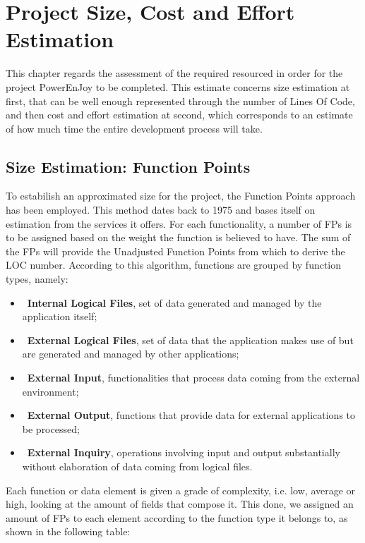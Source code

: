 \chapter{Project Size, Cost and Effort Estimation}

This chapter regards the assessment of the required resourced in order for the project PowerEnJoy to be completed. This estimate concerns size estimation at first, that can be well enough represented through the number of Lines Of Code, and then cost and effort estimation at second, which corresponds to an estimate of how much time the entire development process will take.


\section{Size Estimation: Function Points}

To estabilish an approximated size for the project, the Function Points approach has been employed. This method dates back to 1975 and bases itself on estimation from the services it offers. For each functionality, a number of FPs is to be assigned based on the weight the function is believed to have. The sum of the FPs will provide the Unadjusted Function Points from which to derive the LOC number. According to this algorithm, functions are grouped by function types, namely:

\begin{itemize}
\item\ \textbf{Internal Logical Files}, set of data generated and managed by the application itself;
\item\ \textbf{External Logical Files}, set of data that the application makes use of but are generated and managed by other applications;
\item\ \textbf{External Input}, functionalities that process data coming from the external environment;
\item\ \textbf{External Output}, functions that provide data for external applications to be processed;
\item\ \textbf{External Inquiry}, operations involving input and output substantially without elaboration of data coming from logical files.
\end{itemize}

Each function or data element is given a grade of complexity, i.e. low, average or high, looking at the amount of fields that compose it. This done, we assigned an amount of FPs to each element according to the function type it belongs to, as shown in the following table:

